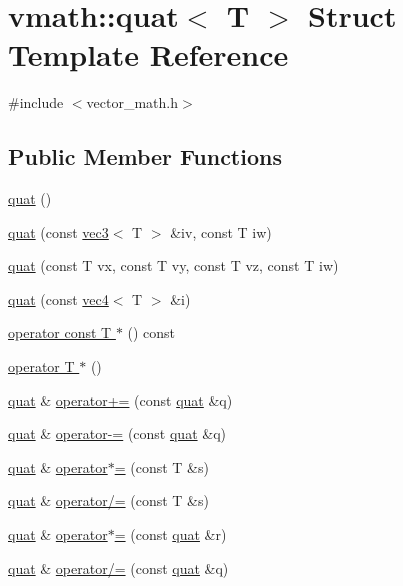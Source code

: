 \hypertarget{structvmath_1_1quat}{\section{vmath\-:\-:quat$<$ T $>$ Struct Template Reference}
\label{structvmath_1_1quat}
}


{\ttfamily \#include $<$vector\-\_\-math.\-h$>$}

\subsection*{Public Member Functions}
\begin{DoxyCompactItemize}
\item 
\hyperlink{structvmath_1_1quat_a2e84b0f47c53be2f8150fcb4cfa843bc}{quat} ()
\item 
\hyperlink{structvmath_1_1quat_afc8b20368139928065a9b0be286a0bcf}{quat} (const \hyperlink{structvmath_1_1vec3}{vec3}$<$ T $>$ \&iv, const T iw)
\item 
\hyperlink{structvmath_1_1quat_a459a5362c8001b6774360753d699d9d2}{quat} (const T vx, const T vy, const T vz, const T iw)
\item 
\hyperlink{structvmath_1_1quat_a0b799087a23965183ec4043261ece435}{quat} (const \hyperlink{structvmath_1_1vec4}{vec4}$<$ T $>$ \&i)
\item 
\hyperlink{structvmath_1_1quat_a57ea27536264836dbcd9f2643cd28421}{operator const T $\ast$} () const 
\item 
\hyperlink{structvmath_1_1quat_a0db2ea240cb343e3dd98cfc17060db07}{operator T $\ast$} ()
\item 
\hyperlink{structvmath_1_1quat}{quat} \& \hyperlink{structvmath_1_1quat_a58159f23a5df11b71eddd8b8591aea37}{operator+=} (const \hyperlink{structvmath_1_1quat}{quat} \&q)
\item 
\hyperlink{structvmath_1_1quat}{quat} \& \hyperlink{structvmath_1_1quat_afa16b0436ec0348d5aae38939c834446}{operator-\/=} (const \hyperlink{structvmath_1_1quat}{quat} \&q)
\item 
\hyperlink{structvmath_1_1quat}{quat} \& \hyperlink{structvmath_1_1quat_ae02fe05eca261b5600ba4de29aea43ff}{operator$\ast$=} (const T \&s)
\item 
\hyperlink{structvmath_1_1quat}{quat} \& \hyperlink{structvmath_1_1quat_aa57a0ccba59d1c2e880ffae39b29b7d6}{operator/=} (const T \&s)
\item 
\hyperlink{structvmath_1_1quat}{quat} \& \hyperlink{structvmath_1_1quat_a7dc74b36f9547b1afadaea36555359af}{operator$\ast$=} (const \hyperlink{structvmath_1_1quat}{quat} \&r)
\item 
\hyperlink{structvmath_1_1quat}{quat} \& \hyperlink{structvmath_1_1quat_ae9a5e03adfbf04a52917e213088e4119}{operator/=} (const \hyperlink{structvmath_1_1quat}{quat} \&q)
\end{DoxyCompactItemize}
